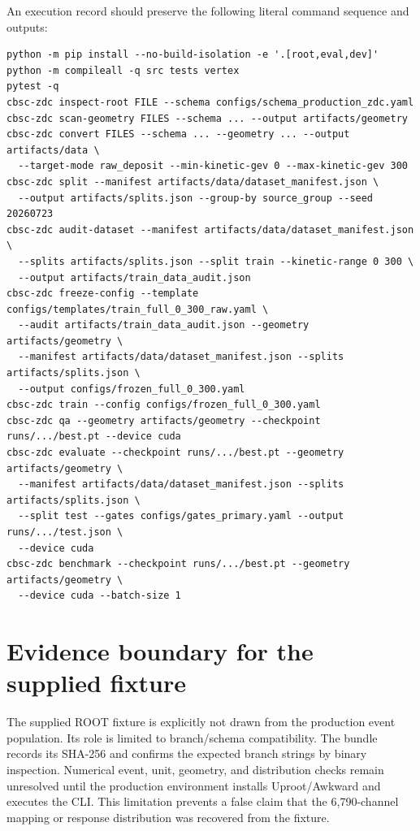 \documentclass[10pt,a4paper]{article}
\begin{document}
An execution record should preserve the following literal command sequence and outputs:
\begin{lstlisting}
python -m pip install --no-build-isolation -e '.[root,eval,dev]'
python -m compileall -q src tests vertex
pytest -q
cbsc-zdc inspect-root FILE --schema configs/schema_production_zdc.yaml
cbsc-zdc scan-geometry FILES --schema ... --output artifacts/geometry
cbsc-zdc convert FILES --schema ... --geometry ... --output artifacts/data \
  --target-mode raw_deposit --min-kinetic-gev 0 --max-kinetic-gev 300
cbsc-zdc split --manifest artifacts/data/dataset_manifest.json \
  --output artifacts/splits.json --group-by source_group --seed 20260723
cbsc-zdc audit-dataset --manifest artifacts/data/dataset_manifest.json \
  --splits artifacts/splits.json --split train --kinetic-range 0 300 \
  --output artifacts/train_data_audit.json
cbsc-zdc freeze-config --template configs/templates/train_full_0_300_raw.yaml \
  --audit artifacts/train_data_audit.json --geometry artifacts/geometry \
  --manifest artifacts/data/dataset_manifest.json --splits artifacts/splits.json \
  --output configs/frozen_full_0_300.yaml
cbsc-zdc train --config configs/frozen_full_0_300.yaml
cbsc-zdc qa --geometry artifacts/geometry --checkpoint runs/.../best.pt --device cuda
cbsc-zdc evaluate --checkpoint runs/.../best.pt --geometry artifacts/geometry \
  --manifest artifacts/data/dataset_manifest.json --splits artifacts/splits.json \
  --split test --gates configs/gates_primary.yaml --output runs/.../test.json \
  --device cuda
cbsc-zdc benchmark --checkpoint runs/.../best.pt --geometry artifacts/geometry \
  --device cuda --batch-size 1
\end{lstlisting}

\section{Evidence boundary for the supplied fixture}

The supplied ROOT fixture is explicitly not drawn from the production event population. Its role is limited to branch/schema compatibility. The bundle records its SHA-256 and confirms the expected branch strings by binary inspection. Numerical event, unit, geometry, and distribution checks remain unresolved until the production environment installs Uproot/Awkward and executes the CLI. This limitation prevents a false claim that the 6,790-channel mapping or response distribution was recovered from the fixture.

\printbibliography
\end{document}
